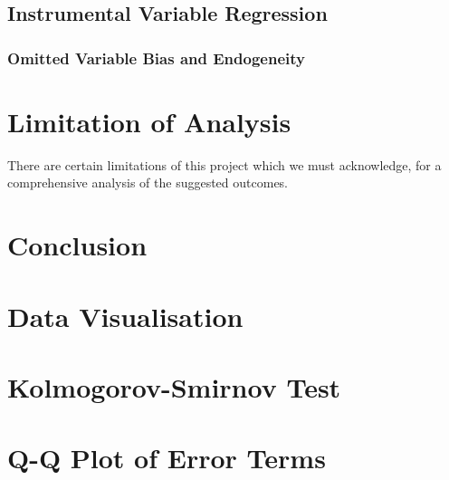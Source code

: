 \documentclass{article}
\begin{document}
\subsection{Instrumental Variable Regression}

\subsubsection{Omitted Variable Bias and Endogeneity}

\section{Limitation of Analysis}\label{limitations}
There are certain limitations of this project which we must acknowledge, for a comprehensive analysis of the suggested outcomes. 

\section{Conclusion}

\newpage
\clearpage
{}
\begin{appendices}

\section{Data Visualisation}

\section{Kolmogorov-Smirnov Test}

\section{Q-Q Plot of Error Terms}

\end{appendices}

\newpage


\end{document}
